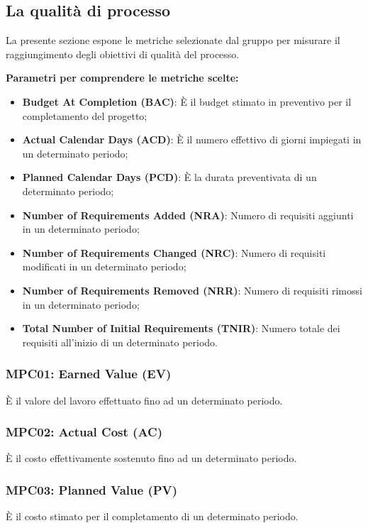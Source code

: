 \subsection{La qualità di processo}
La presente sezione espone le metriche selezionate dal gruppo \groupName{} per misurare il raggiungimento degli obiettivi di qualità del processo.

\textbf{Parametri per comprendere le metriche scelte:}
\begin{itemize}
    \item \textbf{Budget At Completion (BAC)}: È il budget stimato in preventivo per il completamento del progetto;
    \item \textbf{Actual Calendar Days (ACD)}: È il numero effettivo di giorni impiegati in un determinato periodo;
    \item \textbf{Planned Calendar Days (PCD)}: È la durata preventivata di un determinato periodo;
    \item \textbf{Number of Requirements Added (NRA)}: Numero di requisiti aggiunti in un determinato periodo;
    \item \textbf{Number of Requirements Changed (NRC)}: Numero di requisiti modificati in un determinato periodo;
    \item \textbf{Number of Requirements Removed (NRR)}: Numero di requisiti rimossi in un determinato periodo;
    \item \textbf{Total Number of Initial Requirements (TNIR)}: Numero totale dei requisiti all'inizio di un determinato periodo.
\end{itemize}

\subsubsection{MPC01: Earned Value (EV)}\label{sssec:earned_value}
È il valore del lavoro effettuato fino ad un determinato periodo.

\subsubsection{MPC02: Actual Cost (AC)}\label{sssec:actual_cost}
È il costo effettivamente sostenuto fino ad un determinato periodo.

\subsubsection{MPC03: Planned Value (PV)}\label{sssec:planned_value}
È il costo stimato per il completamento di un determinato periodo.

